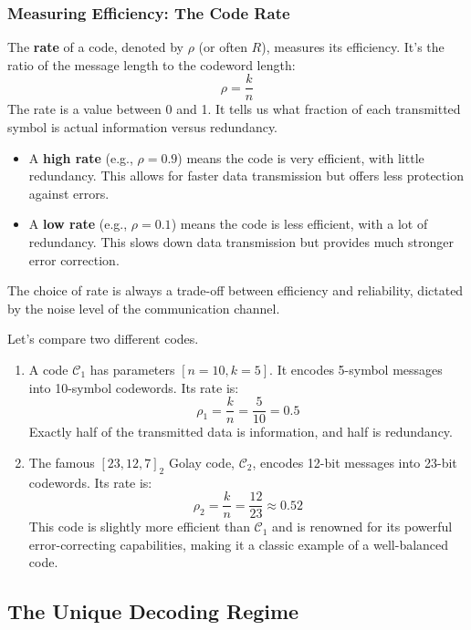 \documentclass{article}
\begin{document}
\subsubsection{Measuring Efficiency: The Code Rate}
The \textbf{rate} of a code, denoted by $\rho$ (or often $R$), measures its efficiency. It's the ratio of the message length to the codeword length:
\[
\rho = \frac{k}{n}
\]
The rate is a value between 0 and 1. It tells us what fraction of each transmitted symbol is actual information versus redundancy.
\begin{itemize}
    \item A \textbf{high rate} (e.g., $\rho = 0.9$) means the code is very efficient, with little redundancy. This allows for faster data transmission but offers less protection against errors.
    \item A \textbf{low rate} (e.g., $\rho = 0.1$) means the code is less efficient, with a lot of redundancy. This slows down data transmission but provides much stronger error correction.
\end{itemize}
The choice of rate is always a trade-off between efficiency and reliability, dictated by the noise level of the communication channel.

\begin{tcolorbox}[title={Example: Comparing Code Rates}]
Let's compare two different codes.
\begin{enumerate}
    \item A code $\mathcal{C}_1$ has parameters $[n=10, k=5]$. It encodes 5-symbol messages into 10-symbol codewords. Its rate is:
    \[ \rho_1 = \frac{k}{n} = \frac{5}{10} = 0.5 \]
    Exactly half of the transmitted data is information, and half is redundancy.

    \item The famous $[23, 12, 7]_2$ Golay code, $\mathcal{C}_2$, encodes 12-bit messages into 23-bit codewords. Its rate is:
    \[ \rho_2 = \frac{k}{n} = \frac{12}{23} \approx 0.52 \]
    This code is slightly more efficient than $\mathcal{C}_1$ and is renowned for its powerful error-correcting capabilities, making it a classic example of a well-balanced code.
\end{enumerate}
\end{tcolorbox}


\subsection{The Unique Decoding Regime}
\end{document}
